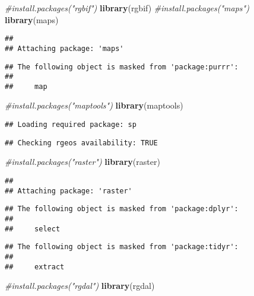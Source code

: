 \documentclass[]{article}
\newenvironment{Shaded}{\begin{snugshade}}{\end{snugshade}}
\newcommand{\KeywordTok}[1]{\textcolor[rgb]{0.13,0.29,0.53}{\textbf{#1}}}
\newcommand{\CommentTok}[1]{\textcolor[rgb]{0.56,0.35,0.01}{\textit{#1}}}
\newcommand{\NormalTok}[1]{#1}
\begin{document}
\begin{Shaded}
\begin{Highlighting}[]
  \CommentTok{#install.packages("rgbif")}
    \KeywordTok{library}\NormalTok{(rgbif)}
  \CommentTok{#install.packages("maps")}
    \KeywordTok{library}\NormalTok{(maps)}
\end{Highlighting}
\end{Shaded}

\begin{verbatim}
## 
## Attaching package: 'maps'
\end{verbatim}

\begin{verbatim}
## The following object is masked from 'package:purrr':
## 
##     map
\end{verbatim}

\begin{Shaded}
\begin{Highlighting}[]
  \CommentTok{#install.packages("maptools")}
    \KeywordTok{library}\NormalTok{(maptools)  }
\end{Highlighting}
\end{Shaded}

\begin{verbatim}
## Loading required package: sp
\end{verbatim}

\begin{verbatim}
## Checking rgeos availability: TRUE
\end{verbatim}

\begin{Shaded}
\begin{Highlighting}[]
  \CommentTok{#install.packages("raster")}
    \KeywordTok{library}\NormalTok{(raster)}
\end{Highlighting}
\end{Shaded}

\begin{verbatim}
## 
## Attaching package: 'raster'
\end{verbatim}

\begin{verbatim}
## The following object is masked from 'package:dplyr':
## 
##     select
\end{verbatim}

\begin{verbatim}
## The following object is masked from 'package:tidyr':
## 
##     extract
\end{verbatim}

\begin{Shaded}
\begin{Highlighting}[]
  \CommentTok{#install.packages("rgdal") }
    \KeywordTok{library}\NormalTok{(rgdal) }
\end{Highlighting}
\end{Shaded}
\end{document}
